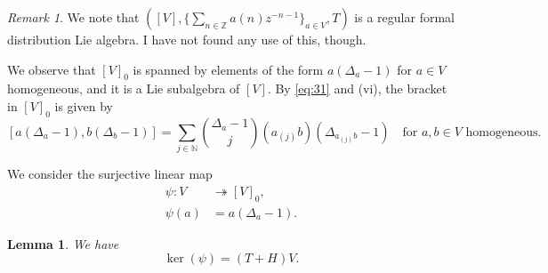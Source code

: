 \documentclass[a4paper, 12pt, reqno]{amsart}
\newtheorem{lemma}[theorem]{Lemma}
\theoremstyle{remark}
\newtheorem{remark}[theorem]{Remark}
\begin{document}
\begin{remark}
  \label{rmk:27}
  We note that $([V], \{\sum_{n \in \mathbb{Z}}a(n)z^{-n - 1}\}_{a \in V}, T)$ is a regular formal distribution Lie algebra.
  I have not found any use of this, though.
\end{remark}

We observe that $[V]_0$ is spanned by elements of the form $a(\Delta_a - 1)$ for $a \in V$ homogeneous, and it is a Lie subalgebra of $[V]$.
By \eqref{eq:31} and (vi), the bracket in $[V]_0$ is given by
\begin{equation}
  \label{eq:33}
  [a(\Delta_a - 1), b(\Delta_b - 1)] = \sum_{j \in \mathbb{N}}\binom{\Delta_a - 1}{j}(a_{(j)}b)(\Delta_{a_{(j)}b} - 1) \quad \text{for $a, b \in V$ homogeneous}.
\end{equation}

We consider the surjective linear map
\begin{align*}
  \psi: V &\twoheadrightarrow [V]_0, \\
  \psi(a) &= a(\Delta_a - 1).
\end{align*}

\begin{lemma}
  \label{lmm:16}
  We have
  \begin{equation*}
    \ker(\psi) = (T + H)V.
  \end{equation*}
\end{lemma}
\end{document}
